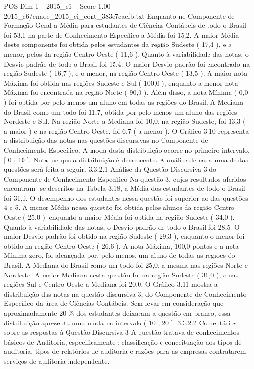 \begin{textsample}{POS Dim 1 – 2015\_c6 – Score 1.00 – 2015\_c6/enade\_2015\_ci\_cont\_383e7cacfb.txt}
Enquanto no Componente de Formação Geral a Média para estudantes de Ciências Contábeis de todo o Brasil foi 53,1 na parte de Conhecimento Específico a Média foi 15,2.
A maior Média deste componente foi obtida pelos estudantes da região Sudeste ( 17,4 ), e a menor, pelos da região Centro-Oeste ( 11,6 ).
Quanto à variabilidade das notas, o Desvio padrão de todo o Brasil foi 15,4.
O maior Desvio padrão foi encontrado na região Sudeste ( 16,7 ), e o menor, na região Centro-Oeste ( 13,5 ).
A maior nota Máxima foi obtida nas regiões Sudeste e Sul ( 100,0 ), enquanto a menor nota Máxima foi encontrada na região Norte ( 90,0 ).
Além disso, a nota Mínima ( 0,0 ) foi obtida por pelo menos um aluno em todas as regiões do Brasil.
A Mediana do Brasil como um todo foi 11,7, obtida por pelo menos um aluno das regiões Nordeste e Sul.
Na região Norte a Mediana foi 10,0, na região Sudeste, foi 13,3 ( a maior ) e na região Centro-Oeste, foi 6,7 ( a menor ).
O Gráfico 3.10 representa a distribuição das notas nas questões discursivas no Componente de Conhecimento Específico.
A moda desta distribuição ocorre no primeiro intervalo, [ 0 ; 10 ].
Nota -se que a distribuição é decrescente.
A análise de cada uma destas questões será feita a seguir. 3.3.2.1 Análise da Questão Discursiva 3 do Componente de Conhecimento Específico Na questão 3, cujos resultados aferidos encontram -se descritos na Tabela 3.18, a Média dos estudantes de todo o Brasil foi 31,0.
O desempenho dos estudantes nessa questão foi superior ao das questões 4 e 5.
A menor Média nessa questão foi obtida pelos alunos da região Centro-Oeste ( 25,0 ), enquanto a maior Média foi obtida na região Sudeste ( 34,0 ).
Quanto à variabilidade das notas, o Desvio padrão de todo o Brasil foi 28,5.
O maior Desvio padrão foi obtido na região Sudeste ( 29,3 ), enquanto o menor foi obtido na região Centro-Oeste ( 26,6 ).
A nota Máxima, 100,0 pontos e a nota Mínima zero, foi alcançada por, pelo menos, um aluno de todas as regiões do Brasil.
A Mediana do Brasil como um todo foi 25,0, a mesma nas regiões Norte e Nordeste.
A maior Mediana nesta questão foi na região Sudeste ( 30,0 ), e nas regiões Sul e Centro-Oeste a Mediana foi 20,0.
O Gráfico 3.11 mostra a distribuição das notas na questão discursiva 3, do Componente de Conhecimento Específico da área de Ciências Contábeis.
Sem levar em consideração que aproximadamente 20 \% dos estudantes deixaram a questão em branco, essa distribuição apresenta uma moda no intervalo ( 10 ; 20 ]. 3.3.2.2 Comentários sobre as respostas à Questão Discursiva 3 A questão tratava de conhecimentos básicos de Auditoria, especificamente : classificação e conceituação dos tipos de auditoria, tipos de relatórios de auditoria e razões para as empresas contratarem serviços de auditoria independente.

\end{textsample}
